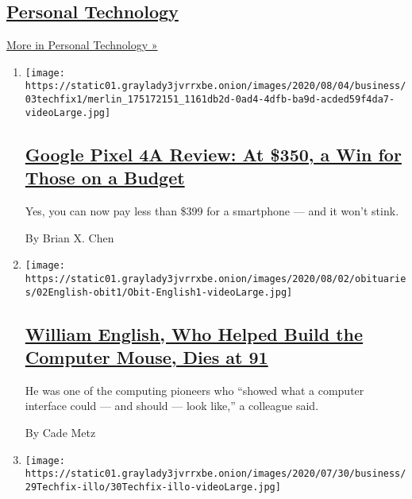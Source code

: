 \hypertarget{personal-technology}{%
\subsection{\texorpdfstring{\href{/section/technology/personaltech}{Personal
Technology}}{Personal Technology}}\label{personal-technology}}

\href{/section/technology/personaltech}{More in Personal Technology »}

\begin{enumerate}
\def\labelenumi{\arabic{enumi}.}
\item
  \texttt{[image: https://static01.graylady3jvrrxbe.onion/images/2020/08/04/business/03techfix1/merlin\_175172151\_1161db2d-0ad4-4dfb-ba9d-acded59f4da7-videoLarge.jpg]}

  \hypertarget{google-pixel-4a-review-at-350-a-win-for-those-on-a-budget}{%
  \subsection{\texorpdfstring{\href{/2020/08/03/technology/personaltech/google-pixel-4a-review.html}{Google
  Pixel 4A Review: At \$350, a Win for Those on a
  Budget}}{Google Pixel 4A Review: At \$350, a Win for Those on a Budget}}\label{google-pixel-4a-review-at-350-a-win-for-those-on-a-budget}}

  Yes, you can now pay less than \$399 for a smartphone --- and it won't
  stink.

  By Brian X. Chen
\item
  \texttt{[image: https://static01.graylady3jvrrxbe.onion/images/2020/08/02/obituaries/02English-obit1/Obit-English1-videoLarge.jpg]}

  \hypertarget{william-english-who-helped-build-the-computer-mouse-dies-at-91}{%
  \subsection{\texorpdfstring{\href{/2020/07/31/technology/william-english-who-helped-build-the-computer-mouse-dies-at-91.html}{William
  English, Who Helped Build the Computer Mouse, Dies at
  91}}{William English, Who Helped Build the Computer Mouse, Dies at 91}}\label{william-english-who-helped-build-the-computer-mouse-dies-at-91}}

  He was one of the computing pioneers who ``showed what a computer
  interface could --- and should --- look like,'' a colleague said.

  By Cade Metz
\item
  \texttt{[image: https://static01.graylady3jvrrxbe.onion/images/2020/07/30/business/29Techfix-illo/30Techfix-illo-videoLarge.jpg]}


\end{enumerate}
